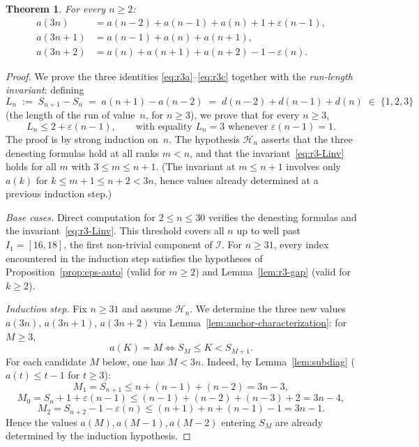 \documentclass[12pt]{article}
\newtheorem{theorem}{Theorem}[section]
\theoremstyle{definition}
\theoremstyle{remark}
\begin{document}
\begin{theorem}\label{thm:r3}
For every $n\ge 2$:
\begin{align}
  a(3n)   &= a(n-2)+a(n-1)+a(n)+1+\varepsilon(n-1), \label{eq:r3a}\\
  a(3n+1) &= a(n-1)+a(n)+a(n+1),                    \label{eq:r3b}\\
  a(3n+2) &= a(n)+a(n+1)+a(n+2)-1-\varepsilon(n).   \label{eq:r3c}
\end{align}
\end{theorem}

\begin{proof}
We prove the three identities \eqref{eq:r3a}--\eqref{eq:r3c} together with
the \emph{run-length invariant}: defining
\begin{equation}\label{eq:Ldef}
  L_n\;:=\;S_{n+1}-S_n\;=\;a(n+1)-a(n-2)\;=\;d(n-2)+d(n-1)+d(n)
  \;\in\;\{1,2,3\}
\end{equation}
(the length of the run of value~$n$, for $n\ge 3$), we prove that for every $n\ge 3$,
\begin{equation}\label{eq:r3-Linv}
  L_n \le 2+\varepsilon(n-1),
  \qquad\text{with equality } L_n=3 \text{ whenever } \varepsilon(n-1)=1.
\end{equation}
The proof is by strong induction on~$n$.
The hypothesis $\mathcal{H}_n$ asserts that the three denesting formulas hold
at all ranks $m<n$, and that the invariant~\eqref{eq:r3-Linv} holds for
all $m$ with $3\le m\le n+1$.
(The invariant at $m\le n+1$ involves only $a(k)$ for $k\le m+1\le n+2<3n$,
hence values already determined at a previous induction step.)

\textit{Base cases.}
Direct computation for $2\le n\le 30$ verifies the denesting formulas
and the invariant~\eqref{eq:r3-Linv}.
This threshold covers all $n$ up to well past $I_1=[16,18]$,
the first non-trivial component of $\mathcal{I}$. For $n\ge 31$, every index
encountered in the induction step satisfies the hypotheses of
Proposition~\ref{prop:eps-auto} (valid for $m\ge 2$) and
Lemma~\ref{lem:r3-gap} (valid for $k\ge 2$).

\textit{Induction step.}
Fix $n\ge 31$ and assume $\mathcal{H}_n$.
We determine the three new values $a(3n)$, $a(3n+1)$, $a(3n+2)$
via Lemma~\ref{lem:anchor-characterization}: for $M\ge 3$,
\begin{equation}\label{eq:anchor-char}
  a(K)=M \iff S_M\le K<S_{M+1}.
\end{equation}
For each candidate $M$ below, one has $M<3n$.
Indeed, by Lemma~\ref{lem:subdiag} ($a(t)\le t-1$ for $t\ge 3$):
\[
  M_1 = S_{n+1} \le n+(n{-}1)+(n{-}2)=3n{-}3,
\]
\[
  M_0 = S_n+1+\varepsilon(n{-}1) \le (n{-}1)+(n{-}2)+(n{-}3)+2 = 3n{-}4,
\]
\[
  M_2 = S_{n+2}-1-\varepsilon(n) \le (n{+}1)+n+(n{-}1)-1 = 3n{-}1.
\]
Hence the values $a(M),a(M-1),a(M-2)$ entering $S_M$ are
already determined by the induction hypothesis.


\end{proof}
\end{document}
